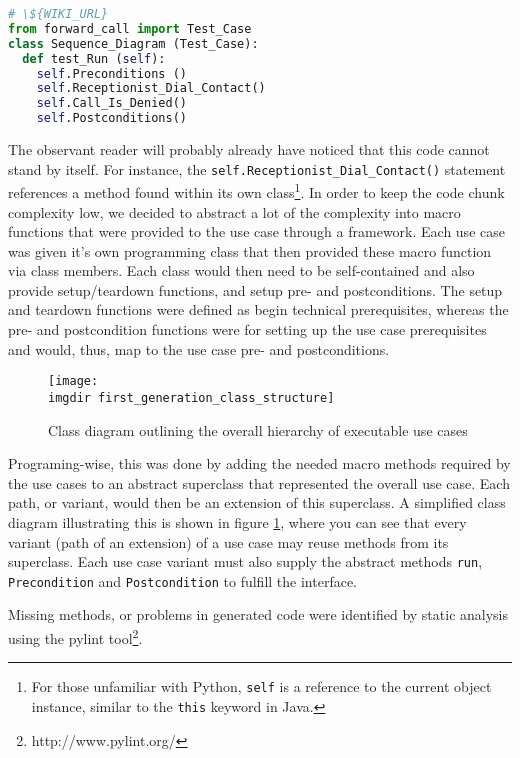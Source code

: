 \begin{lstlisting}[language=Python, caption=Example generated Python code output, label=lst:example_python_output]
# \${WIKI_URL}
from forward_call import Test_Case
class Sequence_Diagram (Test_Case):
  def test_Run (self):
    self.Preconditions ()
    self.Receptionist_Dial_Contact()
    self.Call_Is_Denied()
    self.Postconditions()

\end{lstlisting}

\noindent
The observant reader will probably already have noticed that this code cannot stand by itself. For instance, the \texttt{self.Receptionist\_Dial\_Contact()} statement references a method found within its own class\footnote{For those unfamiliar with Python, \texttt{self} is a reference to the current object instance, similar to the \texttt{this} keyword in Java.}. In order to keep the code chunk complexity low, we decided to abstract a lot of the complexity into macro functions that were provided to the use case through a framework. Each use case was given it's own programming class that then provided these macro function via class members. Each class would then need to be self-contained and also provide setup/teardown functions, and setup pre- and postconditions. The setup and teardown functions were defined as begin technical prerequisites, whereas the pre- and postcondition functions were for setting up the use case prerequisites and would, thus, map to the use case pre- and postconditions.\medskip
\begin{figure}[!h]
\centering
\texttt{[image: \\imgdir first\_generation\_class\_structure]}
\caption{Class diagram outlining the overall hierarchy of executable use cases}
\label{fig:first_generation_class_structure}
\end{figure}
\noindent Programing-wise, this was done by adding the needed macro methods required by the use cases to an abstract superclass that represented the overall use case. Each path, or variant, would then be an extension of this superclass. A simplified class diagram illustrating this is shown in figure \ref{fig:first_generation_class_structure}, where you can see that every variant (path of an extension) of a use case may reuse methods from its superclass. Each use case variant must also supply the abstract methods \texttt{run}, \texttt{Precondition} and \texttt{Postcondition} to fulfill the interface.\medskip

\noindent Missing methods, or problems in generated code were identified by static analysis using the pylint tool\footnote{http://www.pylint.org/}.
\newpage
